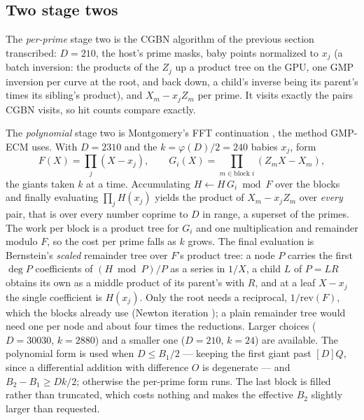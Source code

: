 \documentclass[11pt,a4paper]{article}
\begin{document}
\subsection{Two stage twos}

The \emph{per-prime} stage two is the CGBN algorithm of the previous section transcribed: $D =
210$, the host's prime masks, baby points normalized to $x_j$ (a batch inversion: the products
of the $Z_j$ up a product tree on the GPU, one GMP inversion per curve at the root, and back
down, a child's inverse being its parent's times its sibling's product), and
$X_m - x_j Z_m$ per prime. It visits exactly the pairs CGBN visits, so hit counts compare
exactly.

The \emph{polynomial} stage two is Montgomery's FFT continuation \cite{montgomery1992}, the
method GMP-ECM uses. With $D = 2310$ and the $k = \varphi(D)/2 = 240$ babies $x_j$, form
\[
F(X) = \prod_j (X - x_j), \qquad
G_i(X) = \prod_{m \in \text{block } i} (Z_m X - X_m),
\]
the giants taken $k$ at a time. Accumulating $H \leftarrow H\,G_i \bmod F$ over the blocks and
finally evaluating $\prod_j H(x_j)$ yields the product of $X_m - x_j Z_m$ over \emph{every} pair,
that is over every number coprime to $D$ in range, a superset of the primes. The work per block
is a product tree for $G_i$ and one multiplication and remainder modulo $F$, so the cost per
prime falls as $k$ grows. The final evaluation is Bernstein's \emph{scaled} remainder tree
\cite{bernstein2004} over $F$'s product tree: a node $P$ carries the first $\deg P$
coefficients of $(H \bmod P)/P$ as a series in $1/X$, a child $L$ of $P = LR$ obtains its own
as a middle product of its parent's with $R$, and at a leaf $X - x_j$ the single coefficient is
$H(x_j)$. Only the root needs a reciprocal, $1/\mathrm{rev}(F)$, which the blocks already use
(Newton iteration \cite{vzgathen2013}); a plain remainder tree would need one per node and
about four times the reductions. Larger choices ($D =
30030$, $k = 2880$) and a smaller one ($D = 210$, $k = 24$) are available. The polynomial form is
used when $D \le B_1/2$ --- keeping the first giant past $[D]Q$, since a differential addition
with difference $O$ is degenerate --- and $B_2 - B_1 \ge Dk/2$; otherwise the per-prime form
runs. The last block is filled rather than truncated, which costs nothing and makes the
effective $B_2$ slightly larger than requested.
\end{document}
